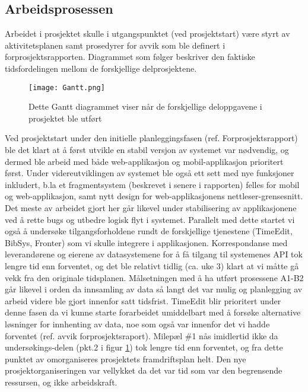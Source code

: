 \documentclass[../main.tex]{subfiles}
\begin{document}
\subsection{Arbeidsprosessen}
Arbeidet i prosjektet skulle i utgangspunktet (ved prosjektstart) være styrt av aktivitetsplanen samt prosedyrer for avvik som ble definert i forprosjektsrapporten. Diagrammet som følger beskriver den faktiske tidsfordelingen mellom de forskjellige delprosjektene.
\begin{figure}[H]
  \centering
  \texttt{[image: Gantt.png]}
  \caption{Dette Gantt diagrammet viser når de forskjellige deloppgavene i prosjektet ble utført}
\label{fig:gantt}
\end{figure}
Ved prosjektstart under den initielle planleggingsfasen (ref. Forprosjektsrapport) ble det klart at å først utvikle en stabil versjon av systemet var nødvendig, og dermed ble arbeid med både web-applikasjon og mobil-applikasjon prioritert først. Under videreutviklingen av systemet ble også ett sett med nye funksjoner inkludert, b.la et fragmentsystem (beskrevet i senere i rapporten) felles for mobil og web-applikasjon, samt nytt design for web-applikasjonens nettleser-grensesnitt. Det meste av arbeidet gjort her går likevel under stabilisering av applikasjonene ved å rette bugs og utbedre logisk flyt i systemet. \newline
Parallelt med dette startet vi også å undersøke tilgangsforholdene rundt de forskjellige tjenestene (TimeEdit, BibSys, Fronter) som vi skulle integrere i applikasjonen. Korrespondanse med leverandørene og eierene av datasystemene for å få tilgang til systemenes API tok lengre tid enn forventet, og det ble relativt tidlig (ca. uke 3) klart at vi måtte gå vekk fra den originale tidsplanen.\newline
Målsetningen med å ha utført prosessene A1-B2 går likevel i orden da innsamling av data så langt det var mulig og planlegging av arbeid videre ble gjort innenfor satt tidsfrist. TimeEdit blir prioritert under denne fasen da vi kunne starte forarbeidet umiddelbart med å forsøke alternative løsninger for innhenting av data, noe som også var innenfor det vi hadde forventet (ref. avvik forprosjektsraport). Milepæl \#1 nås imidlertid ikke da undersøkings-delen (pkt.2 i figur \ref{fig:gantt}) tok lengre tid enn forventet, og fra dette punktet av omorganiseres prosjektets framdriftsplan helt.\newline
Den nye prosjektorganiseringen var vellykket da det var tid som var den begrensende ressursen, og ikke arbeidskraft.

\newpage
\end{document}
